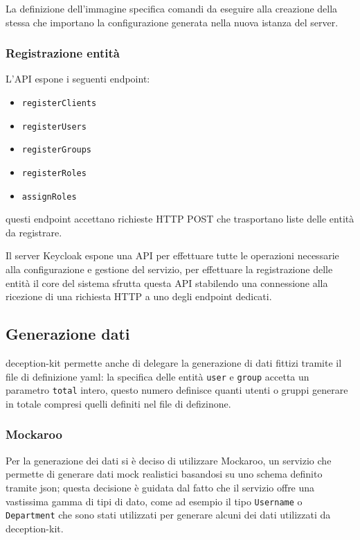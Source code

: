 La definizione dell'immagine specifica comandi da eseguire alla creazione della stessa che importano la configurazione generata nella nuova istanza del server.

\subsubsection{Registrazione entità}

L'API espone i seguenti endpoint:
\begin{itemize}
    \item \texttt{registerClients}
    \item \texttt{registerUsers}
    \item \texttt{registerGroups}
    \item \texttt{registerRoles}
    \item \texttt{assignRoles}
\end{itemize}
questi endpoint accettano richieste HTTP POST che trasportano liste delle entità da registrare.

Il server Keycloak espone una API per effettuare tutte le operazioni necessarie alla configurazione e gestione del servizio, per effettuare la registrazione delle entità il core del sistema sfrutta questa API stabilendo una connessione alla ricezione di una richiesta HTTP a uno degli endpoint dedicati.

\subsection{Generazione dati}

deception-kit permette anche di delegare la generazione di dati fittizi tramite il file di definizione yaml: la specifica delle entità \texttt{user} e \texttt{group} accetta un parametro \texttt{total} intero, questo numero definisce quanti utenti o gruppi generare in totale compresi quelli definiti nel file di defizinone.

\subsubsection{Mockaroo}

Per la generazione dei dati si è deciso di utilizzare Mockaroo, un servizio che permette di generare dati mock realistici basandosi su uno schema definito tramite json; questa decisione è guidata dal fatto che il servizio offre una vastissima gamma di tipi di dato, come ad esempio il tipo \texttt{Username} o \texttt{Department} che sono stati utilizzati per generare alcuni dei dati utilizzati da deception-kit.

